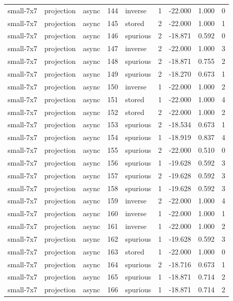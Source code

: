 \begin{tabular}{lllrlrrrr}
small-7x7 & projection & async & 144 & inverse & 1 & -22.000 & 1.000 & 0 \\
small-7x7 & projection & async & 145 & stored & 2 & -22.000 & 1.000 & 1 \\
small-7x7 & projection & async & 146 & spurious & 2 & -18.871 & 0.592 & 0 \\
small-7x7 & projection & async & 147 & inverse & 2 & -22.000 & 1.000 & 3 \\
small-7x7 & projection & async & 148 & spurious & 2 & -18.871 & 0.755 & 2 \\
small-7x7 & projection & async & 149 & spurious & 2 & -18.270 & 0.673 & 1 \\
small-7x7 & projection & async & 150 & inverse & 1 & -22.000 & 1.000 & 2 \\
small-7x7 & projection & async & 151 & stored & 1 & -22.000 & 1.000 & 4 \\
small-7x7 & projection & async & 152 & stored & 2 & -22.000 & 1.000 & 2 \\
small-7x7 & projection & async & 153 & spurious & 2 & -18.534 & 0.673 & 1 \\
small-7x7 & projection & async & 154 & spurious & 1 & -18.919 & 0.837 & 4 \\
small-7x7 & projection & async & 155 & spurious & 2 & -22.000 & 0.510 & 0 \\
small-7x7 & projection & async & 156 & spurious & 1 & -19.628 & 0.592 & 3 \\
small-7x7 & projection & async & 157 & spurious & 2 & -19.628 & 0.592 & 3 \\
small-7x7 & projection & async & 158 & spurious & 1 & -19.628 & 0.592 & 3 \\
small-7x7 & projection & async & 159 & inverse & 2 & -22.000 & 1.000 & 4 \\
small-7x7 & projection & async & 160 & inverse & 1 & -22.000 & 1.000 & 1 \\
small-7x7 & projection & async & 161 & inverse & 1 & -22.000 & 1.000 & 2 \\
small-7x7 & projection & async & 162 & spurious & 1 & -19.628 & 0.592 & 3 \\
small-7x7 & projection & async & 163 & stored & 1 & -22.000 & 1.000 & 0 \\
small-7x7 & projection & async & 164 & spurious & 2 & -18.716 & 0.673 & 1 \\
small-7x7 & projection & async & 165 & spurious & 1 & -18.871 & 0.714 & 2 \\
small-7x7 & projection & async & 166 & spurious & 1 & -18.871 & 0.714 & 2 \\

\end{tabular}
